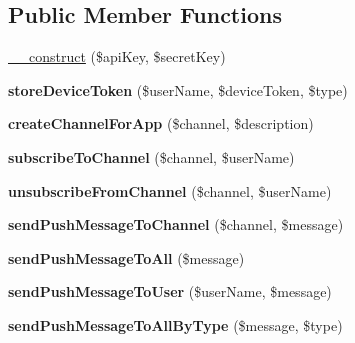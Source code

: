 \subsection*{Public Member Functions}
\begin{DoxyCompactItemize}
\item 
\hyperlink{class_push_notification_service_a49f2ad222e06420736d750e167d55d7c}{\+\_\+\+\_\+construct} (\$api\+Key, \$secret\+Key)
\item 
\hypertarget{class_push_notification_service_a3ece2295d1e70edabad65ad7d988334d}{{\bfseries store\+Device\+Token} (\$user\+Name, \$device\+Token, \$type)}\label{class_push_notification_service_a3ece2295d1e70edabad65ad7d988334d}

\item 
\hypertarget{class_push_notification_service_a84504ef06a8e28e8b3ead88f55d22504}{{\bfseries create\+Channel\+For\+App} (\$channel, \$description)}\label{class_push_notification_service_a84504ef06a8e28e8b3ead88f55d22504}

\item 
\hypertarget{class_push_notification_service_aea6e5a6bf8866f0a2f67f985867a6ec1}{{\bfseries subscribe\+To\+Channel} (\$channel, \$user\+Name)}\label{class_push_notification_service_aea6e5a6bf8866f0a2f67f985867a6ec1}

\item 
\hypertarget{class_push_notification_service_a0650b31b6c3c6849ab98969e0d936161}{{\bfseries unsubscribe\+From\+Channel} (\$channel, \$user\+Name)}\label{class_push_notification_service_a0650b31b6c3c6849ab98969e0d936161}

\item 
\hypertarget{class_push_notification_service_a1b8c0280b138d91c7380495aa4cf80e6}{{\bfseries send\+Push\+Message\+To\+Channel} (\$channel, \$message)}\label{class_push_notification_service_a1b8c0280b138d91c7380495aa4cf80e6}

\item 
\hypertarget{class_push_notification_service_a8287326b66cbdb2c7021d2b05eef6ce6}{{\bfseries send\+Push\+Message\+To\+All} (\$message)}\label{class_push_notification_service_a8287326b66cbdb2c7021d2b05eef6ce6}

\item 
\hypertarget{class_push_notification_service_a5a2991e39132b24099b6810606e5e554}{{\bfseries send\+Push\+Message\+To\+User} (\$user\+Name, \$message)}\label{class_push_notification_service_a5a2991e39132b24099b6810606e5e554}

\item 
\hypertarget{class_push_notification_service_aeaf08d757b461bb1e1ff5274b27172f1}{{\bfseries send\+Push\+Message\+To\+All\+By\+Type} (\$message, \$type)}\label{class_push_notification_service_aeaf08d757b461bb1e1ff5274b27172f1}


\end{DoxyCompactItemize}
